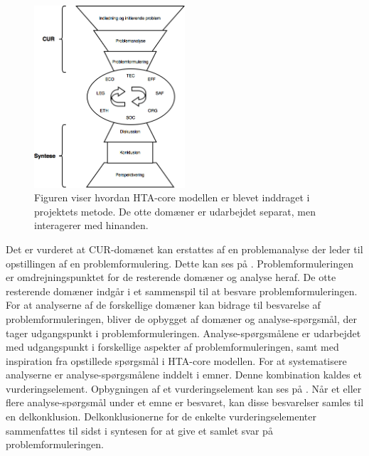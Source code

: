 \begin{figure}[H] 
	\begin{center}
		\includegraphics[width=0.5\textwidth]{figures/cMetode/metode}
	\end{center}
	\caption{Figuren viser hvordan HTA-core modellen er blevet inddraget i projektets metode. De otte domæner er udarbejdet separat, men interagerer med hinanden.} 
	\label{fig:metode} 
\end{figure}\vspace{-.25cm}

Det er vurderet at CUR-domænet kan erstattes af en problemanalyse der leder til opstillingen af en problemformulering. Dette kan ses på . Problemformuleringen er omdrejningspunktet for de resterende domæner og analyse heraf. De otte resterende domæner indgår i et sammenspil til at besvare problemformuleringen. For at analyserne af de forskellige domæner kan bidrage til besvarelse af problemformuleringen, bliver de opbygget af domæner og analyse-spørgsmål, der tager udgangspunkt i problemformuleringen. Analyse-spørgsmålene er udarbejdet med udgangspunkt i forskellige aspekter af problemformuleringen, samt med inspiration fra opstillede spørgsmål i HTA-core modellen. For at systematisere analyserne er analyse-spørgsmålene inddelt i emner. Denne kombination kaldes et vurderingselement. Opbygningen af et vurderingselement kan ses på . Når et eller flere analyse-spørgsmål under et emne er besvaret, kan disse besvarelser samles til en delkonklusion. Delkonklusionerne for de enkelte vurderingselementer sammenfattes til sidst i syntesen for at give et samlet svar på problemformuleringen. \citep{HTAcore}


